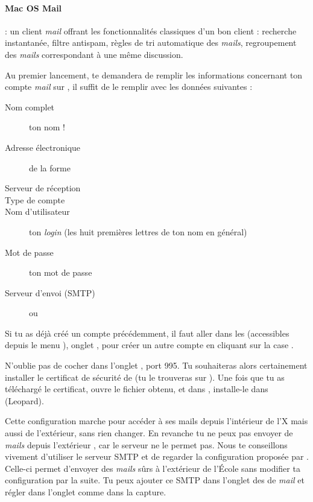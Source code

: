 \paragraph{Mac OS Mail}

  : un client \emph{mail} offrant les fonctionnalit\'es classiques d'un bon client : recherche instantan\'ee, filtre antispam, r\`egles de tri automatique des \emph{mails}, regroupement des \emph{mails} correspondant \`a  une m\^eme discussion.

Au premier lancement,  te demandera de remplir les informations concernant ton compte \emph{mail} sur , il suffit de le remplir avec les donn\'ees suivantes :
\begin{description}
  \item[Nom complet] ton nom !
  \item[Adresse \'electronique] de la forme 
  \item[Serveur de r\'eception] 
  \item[Type de compte] 
  \item[Nom d'utilisateur] ton \emph{login}  (les huit premi\`eres lettres de ton nom en g\'en\'eral)
  \item[Mot de passe] ton mot de passe 
  \item[Serveur d'envoi (SMTP)]  ou 
\end{description}

Si tu as d\'ej\`a  cr\'e\'e un compte pr\'ec\'edemment, il faut aller dans les  (accessibles depuis le menu ), onglet , pour cr\'eer un autre compte en cliquant sur la case \menu{+}.

N'oublie pas de cocher  dans l'onglet , port 995. Tu souhaiteras alors certainement installer le certificat de s\'ecurit\'e de  (tu le trouveras sur ). Une fois que tu as t\'el\'echarg\'e le certificat, ouvre le fichier  obtenu, et dans , installe-le dans %
 (Leopard).

Cette configuration marche pour acc\'eder \`a  ses mails depuis l'int\'erieur de l'X mais aussi de l'ext\'erieur, sans rien changer. En revanche tu ne peux pas envoyer de \emph{mails} depuis l'ext\'erieur , car le serveur  ne le permet pas. Nous te conseillons vivement d'utiliser le serveur SMTP  et de regarder la configuration propos\'ee par . Celle-ci permet d'envoyer des \emph{mails} s\^urs \`a  l'ext\'erieur de l'\'Ecole sans modifier ta configuration par la suite. Tu peux ajouter ce SMTP dans l'onglet  des  de \emph{mail} et r\'egler dans l'onglet  comme dans la capture.


